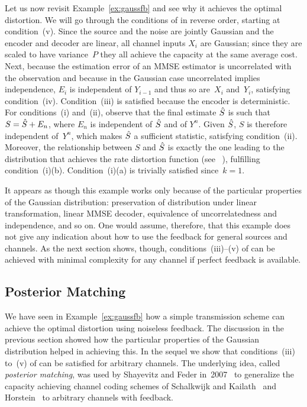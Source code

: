 Let us now revisit Example~\ref{ex:gaussfb} and see why it achieves the optimal
distortion. We will go through the conditions of 
in reverse order, starting at condition~(v). Since the source and the noise are
jointly Gaussian and the encoder and decoder are linear, all channel inputs
$X_i$ are Gaussian; since they are scaled to have variance~$P$ they all achieve
the capacity at the same average cost. Next, because the estimation error of an
MMSE estimator is uncorrelated with the observation and because in the Gaussian
case uncorrelated implies independence, $E_i$ is independent of $Y_{i-1}$ and
thus so are~$X_i$ and~$Y_i$, satisfying condition~(iv). Condition~(iii) is
satisfied because the encoder is deterministic. For conditions~(i) and~(ii),
observe that the final estimate ${\hat{S}}$ is such that $S = {\hat{S}} + E_n$, where $E_n$
is independent of ${\hat{S}}$ and of $Y^n$. Given ${\hat{S}}$, $S$ is therefore independent
of~$Y^n$, which makes ${\hat{S}}$ a sufficient statistic, satisfying condition~(ii).
Moreover, the relationship between $S$ and ${\hat{S}}$ is exactly the one leading to
the distribution that achieves the rate distortion function (see
\eg~\cite{CoverT1991}), fulfilling condition~(i)(b). Condition~(i)(a) is
trivially satisfied since~$k=1$.

It appears as though this example works only because of the particular
properties of the Gaussian distribution: preservation of distribution under
linear transformation, linear MMSE decoder, equivalence of uncorrelatedness and
independence, and so on. One would assume, therefore, that this example does not
give any indication about how to use the feedback for general sources and
channels. As the next section shows, though, conditions~(iii)--(v) of
 can be achieved with minimal complexity for any
channel if perfect feedback is available.


\subsection{Posterior Matching}

We have seen in Example~\ref{ex:gaussfb} how a simple transmission scheme can
achieve the optimal distortion using noiseless feedback. The discussion in the
previous section showed how the particular properties of the Gaussian
distribution helped in achieving this. In the sequel we show that
conditions~(iii) to~(v) of  can be satisfied for arbitrary
channels. The underlying idea, called \emph{posterior matching}, was used by
Shayevitz and Feder in~2007~\cite{ShayevitzF2007,ShayevitzF2008} to generalize
the capacity achieving channel coding schemes of Schalkwijk and
Kailath~\cite{SchalkwijkK1966} and Horstein~\cite{Horstein1963} to arbitrary
channels with feedback.

